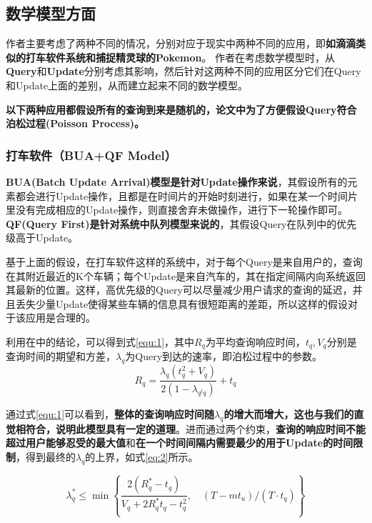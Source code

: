\documentclass{ML}
\begin{document}
\subsection{数学模型方面}
作者主要考虑了两种不同的情况，分别对应于现实中两种不同的应用，即\textbf{如滴滴类似的打车软件系统和捕捉精灵球的Pokemon}。 作者在考虑数学模型时，从\textbf{Query}和\textbf{Update}分别考虑其影响，然后针对这两种不同的应用区分它们在Query和Update上面的差别，从而建立起来不同的数学模型。

\textbf{以下两种应用都假设所有的查询到来是随机的，论文中为了方便假设Query符合泊松过程(Poisson Process)。}
\subsubsection{打车软件（BUA+QF Model）}\label{sec:bua_qf}
\textbf{BUA(Batch Update Arrival)模型是针对Update操作来说}，其假设所有的元素都会进行Update操作，且都是在时间片的开始时刻进行，如果在某一个时间片里没有完成相应的Update操作，则直接舍弃未做操作，进行下一轮操作即可。\textbf{QF(Query First)是针对系统中队列模型来说的}，其假设Query在队列中的优先级高于Update。

基于上面的假设，在打车软件这样的系统中，对于每个Query是来自用户的，查询在其附近最近的K个车辆；每个Update是来自汽车的，其在指定间隔内向系统返回其最新的位置。这样，高优先级的Query可以尽量减少用户请求的查询的延迟，并且丢失少量Update使得某些车辆的信息具有很短距离的差距，所以这样的假设对于该应用是合理的。

利用在\cite{single-server-queue}中的结论，可以得到式\eqref{equ:1}，其中$R_q$为平均查询响应时间，$t_q, V_{q}$分别是查询时间的期望和方差，$\lambda_{q}$为Query到达的速率，即泊松过程中的参数。
\begin{equation}
R_{q}=\frac{\lambda_{q}\left(t_{q}^{2}+V_{q}\right)}{2\left(1-\lambda_{q^{t} q}\right)}+t_{q}
\label{equ:1}
\end{equation}

通过式\eqref{equ:1}可以看到，\textbf{整体的查询响应时间随$\lambda_{q}$的增大而增大，这也与我们的直觉相符合，说明此模型具有一定的道理}。进而通过两个约束，\textbf{查询的响应时间不能超过用户能够忍受的最大值}和\textbf{在一个时间间隔内需要最少的用于Update的时间限制}，得到最终的$\lambda_{q}$的上界，如式\eqref{eq:2}所示。

\begin{equation}
\lambda_{q}^{*} \leq \min \left\{\frac{2\left(R_{q}^{*}-t_{q}\right)}{V_{q}+2 R_{q}^{*} t_{q}-t_{q}^{2}}, \quad\left(T-m t_{u}\right) /\left(T \cdot t_{q}\right)\right\}
\label{eq:2}
\end{equation}
\end{document}
